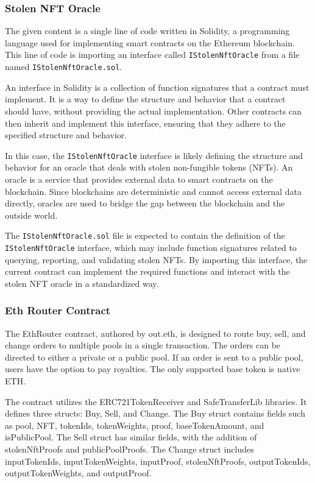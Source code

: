 \hypertarget{stolen-nft-oracle}{%
\subsubsection{Stolen NFT Oracle}\label{stolen-nft-oracle}}

The given content is a single line of code written in Solidity, a
programming language used for implementing smart contracts on the
Ethereum blockchain. This line of code is importing an interface called
\texttt{IStolenNftOracle} from a file named
\texttt{IStolenNftOracle.sol}.

An interface in Solidity is a collection of function signatures that a
contract must implement. It is a way to define the structure and
behavior that a contract should have, without providing the actual
implementation. Other contracts can then inherit and implement this
interface, ensuring that they adhere to the specified structure and
behavior.

In this case, the \texttt{IStolenNftOracle} interface is likely defining
the structure and behavior for an oracle that deals with stolen
non-fungible tokens (NFTs). An oracle is a service that provides
external data to smart contracts on the blockchain. Since blockchains
are deterministic and cannot access external data directly, oracles are
used to bridge the gap between the blockchain and the outside world.

The \texttt{IStolenNftOracle.sol} file is expected to contain the
definition of the \texttt{IStolenNftOracle} interface, which may include
function signatures related to querying, reporting, and validating
stolen NFTs. By importing this interface, the current contract can
implement the required functions and interact with the stolen NFT oracle
in a standardized way.

\hypertarget{eth-router-contract}{%
\subsubsection{Eth Router Contract}\label{eth-router-contract}}

The EthRouter contract, authored by out.eth, is designed to route buy,
sell, and change orders to multiple pools in a single transaction. The
orders can be directed to either a private or a public pool. If an order
is sent to a public pool, users have the option to pay royalties. The
only supported base token is native ETH.

The contract utilizes the ERC721TokenReceiver and SafeTransferLib
libraries. It defines three structs: Buy, Sell, and Change. The Buy
struct contains fields such as pool, NFT, tokenIds, tokenWeights, proof,
baseTokenAmount, and isPublicPool. The Sell struct has similar fields,
with the addition of stolenNftProofs and publicPoolProofs. The Change
struct includes inputTokenIds, inputTokenWeights, inputProof,
stolenNftProofs, outputTokenIds, outputTokenWeights, and outputProof.

